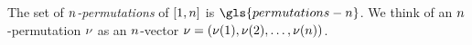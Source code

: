 
The set of \emph{$n$-permutations} of $[1,n]$ is $\gls{permutations-n}$.
We think of an $n$-permutation $\nu$ as an $n$-vector
$\nu = \left(\nu(1), \nu(2), \dots, \nu(n)\right)$.